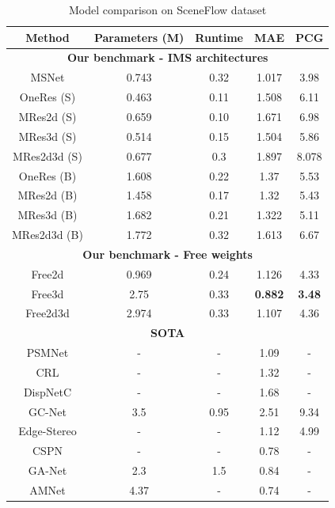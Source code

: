 \documentclass[runningheads]{llncs}
\begin{document}
\begin{table}[t]
    \centering
    \begin{tabular}{ c|c|c|c|c }
    Method & Parameters (M) & Runtime & MAE & PCG \\
    
    \hline
    \multicolumn{5}{c}{ \textbf{Our benchmark - IMS architectures} } \\
    \hline
    MSNet & 0.743 & 0.32 & 1.017 & 3.98 \\
    \hline
    OneRes (S) & 0.463 & 0.11 & 1.508 & 6.11 \\
    MRes2d (S) & 0.659 & 0.10 & 1.671 & 6.98 \\
    MRes3d (S) & 0.514 & 0.15 & 1.504 & 5.86 \\
    MRes2d3d (S) & 0.677 & 0.3 & 1.897 & 8.078 \\
    \hline
    OneRes (B) & 1.608 & 0.22 & 1.37 & 5.53 \\
    MRes2d (B) & 1.458 & 0.17 & 1.32 & 5.43 \\
    MRes3d (B) & 1.682 & 0.21 & 1.322 & 5.11 \\
    MRes2d3d (B) & 1.772 & 0.32 & 1.613 & 6.67 \\
    \hline
    \multicolumn{5}{c}{ \textbf{Our benchmark - Free weights} } \\
    \hline
    Free2d & 0.969 & 0.24 & 1.126 & 4.33 \\
    Free3d & 2.75 & 0.33 & \textbf{0.882} & \textbf{3.48} \\
    Free2d3d & 2.974 & 0.33 & 1.107 & 4.36 \\
    \hline
    \multicolumn{5}{c}{ \textbf{SOTA} } \\
    \hline
    PSMNet\cite{Chang2018PyramidNetwork} & - & - & 1.09 & - \\
    CRL\cite{Pang2018CascadeMatching} & - & - & 1.32 & - \\
    DispNetC\cite{Mayer2016ALD} & - & - & 1.68 & - \\
    GC-Net\cite{Kendall2017End-to-EndRegression} & 3.5 & 0.95 & 2.51 & 9.34 \\
    Edge-Stereo\cite{SongEdgeStereoResidual} & - & - & 1.12 & 4.99 \\
    CSPN\cite{cheng2018learning} & - & - & 0.78 & - \\
    GA-Net\cite{zhang2019ga} & 2.3 & 1.5 & 0.84 & - \\
    AMNet\cite{du2019amnet} & 4.37 & - & 0.74 & - \\
    
    \hline
    \end{tabular}
    \caption{Model comparison on SceneFlow dataset}
    \label{tab:results}
\end{table}
\end{document}
